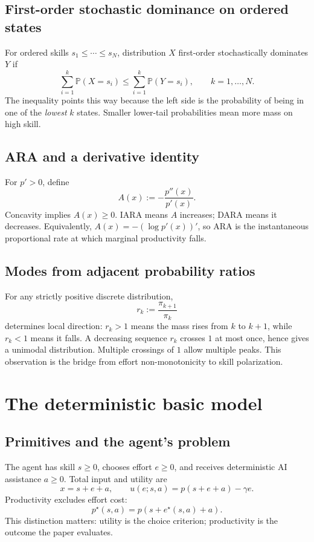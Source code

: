 \documentclass[11pt]{article}
\theoremstyle{tutorial}
\theoremstyle{remark}
\newcommand{\Pp}{\mathbb{P}}
\newcommand{\1}{\mathbb{I}}
\begin{document}
\subsection{First-order stochastic dominance on ordered states}

For ordered skills $s_1\le\cdots\le s_N$, distribution $X$ first-order stochastically dominates $Y$ if
\[
  \sum_{i=1}^k \Pp(X=s_i)\le \sum_{i=1}^k\Pp(Y=s_i),\qquad k=1,\ldots,N.
\]
The inequality points this way because the left side is the probability of being in one of the \emph{lowest}
$k$ states.  Smaller lower-tail probabilities mean more mass on high skill.

\subsection{ARA and a derivative identity}

For $p'>0$, define
\[
  A(x):=-\frac{p''(x)}{p'(x)}.
\]
Concavity implies $A(x)\ge0$.  IARA means $A$ increases; DARA means it decreases.  Equivalently,
$A(x)=-(\log p'(x))'$, so ARA is the instantaneous proportional rate at which marginal productivity falls.

\subsection{Modes from adjacent probability ratios}

For any strictly positive discrete distribution,
\[
  r_k:=\frac{\pi_{k+1}}{\pi_k}
\]
determines local direction: $r_k>1$ means the mass rises from $k$ to $k+1$, while $r_k<1$ means it falls.
A decreasing sequence $r_k$ crosses $1$ at most once, hence gives a unimodal distribution.  Multiple
crossings of $1$ allow multiple peaks.  This observation is the bridge from effort non-monotonicity to skill
polarization.

\section{The deterministic basic model}

\subsection{Primitives and the agent's problem}

The agent has skill $s\ge0$, chooses effort $e\ge0$, and receives deterministic AI assistance $a\ge0$.
Total input and utility are
\[
  x=s+e+a,
  \qquad u(e;s,a)=p(s+e+a)-\gamma e.
\]
Productivity excludes effort cost:
\[
  p^\star(s,a)=p(s+e^\star(s,a)+a).
\]
This distinction matters: utility is the choice criterion; productivity is the outcome the paper evaluates.
\end{document}
